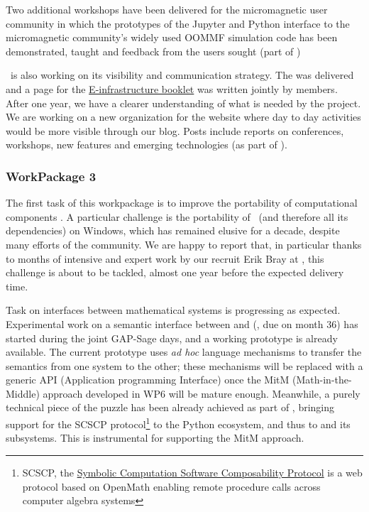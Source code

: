 \documentclass{deliverablereport}
\begin{document}
Two additional workshops have been delivered for the micromagnetic user community
in which the prototypes of the Jupyter and Python interface to the
micromagnetic community's widely used OOMMF simulation code has been demonstrated,
taught and feedback from the users sought (part of
)

\ODK\ is also working on its visibility and communication strategy. The
 was delivered and a page for the
\href{https://github.com/OpenDreamKit/OpenDreamKit/blob/master/Communication/eInfra-Booklet/ODK.md}{E-infrastructure
  booklet} was written jointly by \ODK members. After one year, we have a clearer
understanding of what is needed by the project.  We are working on a new organization for
the website where day to day activities would be more visible through our blog. Posts
include reports on conferences, workshops, new features and emerging technologies (as part
of ).


\subsubsection{WorkPackage 3}
The first task of this workpackage is to improve the portability of
computational components
. A particular
challenge is the portability of \Sage\ (and therefore all its
dependencies) on Windows, which has remained elusive for a decade,
despite many efforts of the community. We are happy to report that, in
particular thanks to months of intensive and expert work by our
recruit Erik Bray at , this challenge is about to be
tackled, almost one year before the expected delivery time.

Task  on interfaces
between mathematical systems is progressing as expected. Experimental
work on a semantic interface between \GAP and \Sage
(, due
on month 36) has started during the joint GAP-Sage days, and a working
prototype is already available. The current prototype uses \emph{ad
  hoc} language mechanisms to transfer the semantics from one system
to the other; these mechanisms will be replaced with a generic API
(Application programming Interface) once the MitM (Math-in-the-Middle)
approach developed in WP6 will be mature enough. Meanwhile, a purely
technical piece of the puzzle has been already achieved as part of
, bringing support for the SCSCP
protocol\footnote{SCSCP, the
  \href{http://www.symbolic-computing.org/science/index.php/SCSCP}{Symbolic
    Computation Software Composability Protocol} is a web protocol
  based on OpenMath enabling remote procedure calls across computer
  algebra systems}
to the Python ecosystem, and thus to \Sage and its subsystems. This
is instrumental for supporting the MitM approach.
\end{document}
